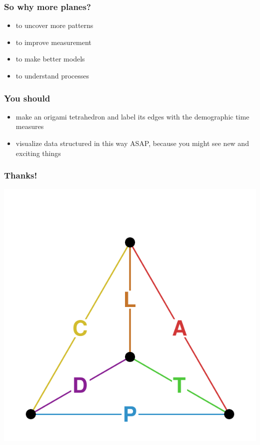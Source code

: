 \documentclass[20pt]{beamer}
\begin{document}
\begin{frame}
\frametitle{So why more planes?}
\normalsize
\begin{itemize}[<+->]
  \item to uncover more patterns  %
  \item to improve measurement    %
  \item to make better models     %
  \item to understand processes   %
\end{itemize}
\end{frame}



\begin{frame}
\frametitle{You should}
\normalsize
\begin{itemize}[<+->]
  \item make an origami tetrahedron and label its edges with the demographic
  time measures
  \item visualize data structured in this way ASAP, because you might see new
  and exciting things
\end{itemize}
\end{frame}


\begin{frame}
\frametitle{Thanks!}
\vspace{-4em}
\begin{center}
\includegraphics[scale=1.7]{Figures/TetraHedronEdgesOnly.pdf}
\end{center}
\end{frame}
\end{document}
